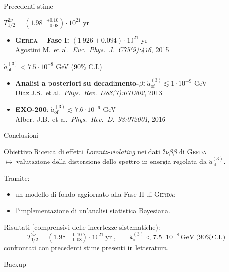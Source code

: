\documentclass[10pt]{beamer}
\newcommand{\aof}{\mathring{a}_\text{of}^{(3)}}
\newcommand{\nbb}{\nu\beta\beta}
\newcommand{\Tnu}{T_{1/2}^{2\nu}}
\newcommand{\gerda}{\textsc{Gerda}}
\begin{document}
\begin{frame}[label=19]{Precedenti stime}
	\begin{exampleblock}{$\Tnu=(1.98\;\;^{+0.10}_{-0.08})\cdot10^{21}$ yr}
		\begin{itemize}
			\item \textbf{{\gerda} -- Fase I:} $(1.926\pm0.094)\cdot10^{21}$ yr \\ {\footnotesize Agostini M.~et al.~\textit{Eur.~Phys.~J.~C75(9):416}, 2015}
		\end{itemize}
	\end{exampleblock}
	\begin{exampleblock}{$\aof<7.5\cdot10^{-8}$ GeV (90\% C.I.)}
		\begin{itemize}
			\item \textbf{Analisi a posteriori su decadimento-$\beta$:} $\aof\lesssim1\cdot10^{-9}$ GeV \\ {\footnotesize Díaz J.S.~et al.~\textit{Phys.~Rev.~D88(7):071902}, 2013}
			\item \textbf{EXO-200:} $\aof\lesssim7.6\cdot10^{-6}$ GeV \\ {\footnotesize Albert J.B.~et al.~\textit{Phys.~Rev.~D.~93:072001}, 2016}
		\end{itemize}
	\end{exampleblock}
\end{frame}
\begin{frame}[label=26]{Conclusioni}
	\begin{alertblock}{Obiettivo}
		Ricerca di effetti \textit{Lorentz-violating} nei dati $2\nbb$ di {\gerda} \\ $\longmapsto$ valutazione della distorsione dello spettro in energia regolata da $\aof$.
	\end{alertblock}
	Tramite:
	\begin{itemize}
		\item un \alert{modello di fondo aggiornato} alla Fase II di {\gerda};
		\item l'implementazione di un'analisi statistica Bayesiana.
	\end{itemize}
	Risultati (comprensivi delle incertezze sistematiche):
	\[\Tnu=(1.98\;\;^{+0.10}_{-0.08})\cdot10^{21}\ \text{yr ,}\qquad\aof<7.5\cdot10^{-8}\ \text{GeV (90\% C.I.)}\]
	confrontati con precedenti stime presenti in letteratura.
\end{frame}
\appendix
\begin{frame}[standout, label=14]
	Backup
\end{frame}
\end{document}

